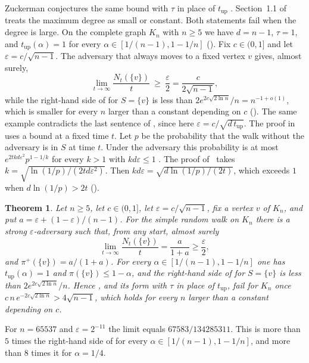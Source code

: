 \documentclass[11pt]{article}
\newtheorem{theorem}{Theorem}
\theoremstyle{remark}
\theoremstyle{plain}
\newcommand{\tup}{t_{\mathrm{up}}}
\begin{document}
Zuckerman conjectures the same bound with $\tau$ in place of $\tup$ \cite[Conjecture~1.18]{Zu}. Section~1.1
of~\cite{Zu} treats the maximum degree as small or constant. Both statements fail when the degree is large. On the
complete graph $K_n$ with $n\ge5$ we have $d=n-1$, $\tau=1$, and $\tup(\alpha)=1$ for every
$\alpha\in[1/(n-1),1-1/n]$ (). Fix $c\in(0,1]$ and let $\varepsilon=c/\sqrt{n-1}$. The adversary that
always moves to a fixed vertex $v$ gives, almost surely,
\[
\lim_{t\to\infty}\frac{N_t(\{v\})}{t}\ \ge\ \frac{\varepsilon}{2}=\frac{c}{2\sqrt{n-1}},
\]
while the right-hand side of  for $S=\{v\}$ is less than $2e^{2c\sqrt{2\ln n}}/n=n^{-1+o(1)}$, which is
smaller for every $n$ larger than a constant depending on $c$ (). The same example contradicts the last
sentence of , since here $\varepsilon=c/\sqrt{d\,\tup}$. The proof in~\cite{Zu} uses a bound at a fixed
time $t$. Let $p$ be the probability that the walk without the adversary is in $S$ at time $t$. Under the adversary
this probability is at most $e^{2tkd\varepsilon^2}p^{1-1/k}$ for every $k>1$ with $kd\varepsilon\le1$
\cite[Theorem~3.3]{Zu}. The proof of~\cite[Corollary~3.5]{Zu} takes $k=\sqrt{\ln(1/p)/(2td\varepsilon^2)}$. Then
$kd\varepsilon=\sqrt{d\ln(1/p)/(2t)}$, which exceeds $1$ when $d\ln(1/p)>2t$ ().

\begin{theorem}\label{thm:fail}
Let $n\ge 5$, let $c\in(0,1]$, let $\varepsilon=c/\sqrt{n-1}$, fix a vertex $v$ of $K_n$, and put
$a=\varepsilon+(1-\varepsilon)/(n-1)$. For the simple random walk on $K_n$ there is a strong $\varepsilon$-adversary
such that, from any start, almost surely
\[
\lim_{t\to\infty}\frac{N_t(\{v\})}{t}=\frac{a}{1+a}\ge\frac{\varepsilon}{2},
\]
and $\pi^+(\{v\})=a/(1+a)$. For every $\alpha\in[1/(n-1),1-1/n]$ one has $\tup(\alpha)=1$ and
$\pi(\{v\})\le1-\alpha$, and the right-hand side of  for $S=\{v\}$ is less than
$2e^{2c\sqrt{2\ln n}}/n$. Hence , and its form with $\tau$ in place of $\tup$, fail for $K_n$ once
$c\,n\,e^{-2c\sqrt{2\ln n}}>4\sqrt{n-1}$, which holds for every $n$ larger than a constant depending on $c$.
\end{theorem}

For $n=65537$ and $\varepsilon=2^{-11}$ the limit equals $67583/134285311$. This is more than $5$ times the
right-hand side of  for every $\alpha\in[1/(n-1),1-1/n]$, and more than $8$ times it for $\alpha=1/4$.
\end{document}
